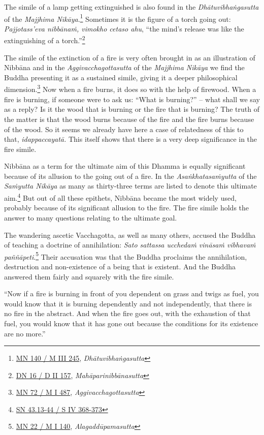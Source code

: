 The simile of a lamp getting extinguished is also found in the \emph{Dhātuvibhaṅgasutta} of the \emph{Majjhima Nikāya}.\footnote{\href{https://suttacentral.net/mn140/pli/ms}{MN 140 / M III 245}, \emph{Dhātuvibhaṅgasutta}} Sometimes it is the figure of a torch going out: \emph{Pajjotass'eva nibbānaṁ, vimokho cetaso ahu}, ``the mind's release was like the extinguishing of a torch.''\footnote{\href{https://suttacentral.net/dn16/pli/ms}{DN 16 / D II 157}, \emph{Mahāparinibbānasutta}}

The simile of the extinction of a fire is very often brought in as an illustration of Nibbāna and in the \emph{Aggivacchagottasutta} of the \emph{Majjhima Nikāya} we find the Buddha presenting it as a sustained simile, giving it a deeper philosophical dimension.\footnote{\href{https://suttacentral.net/mn72/pli/ms}{MN 72 / M I 487}, \emph{Aggivacchagottasutta}} Now when a fire burns, it does so with the help of firewood. When a fire is burning, if someone were to ask us: ``What is burning?'' -- what shall we say as a reply? Is it the wood that is burning or the fire that is burning? The truth of the matter is that the wood burns because of the fire and the fire burns because of the wood. So it seems we already have here a case of relatedness of this to that, \emph{idappaccayatā.} This itself shows that there is a very deep significance in the fire simile.

Nibbāna as a term for the ultimate aim of this Dhamma is equally significant because of its allusion to the going out of a fire. In the \emph{Asaṅkhatasaṁyutta} of the \emph{Saṁyutta Nikāya} as many as thirty-three terms are listed to denote this ultimate aim.\footnote{\href{https://suttacentral.net/sn43.13/pli/ms}{SN 43.13-44 / S IV 368-373}} But out of all these epithets, Nibbāna became the most widely used, probably because of its significant allusion to the fire. The fire simile holds the answer to many questions relating to the ultimate goal.

The wandering ascetic Vacchagotta, as well as many others, accused the Buddha of teaching a doctrine of annihilation: \emph{Sato sattassa ucchedaṁ vināsaṁ vibhavaṁ paññāpeti}.\footnote{\href{https://suttacentral.net/mn22/pli/ms}{MN 22 / M I 140}, \emph{Alagaddūpamasutta}} Their accusation was that the Buddha proclaims the annihilation, destruction and non-existence of a being that is existent. And the Buddha answered them fairly and squarely with the fire simile.

``Now if a fire is burning in front of you dependent on grass and twigs as fuel, you would know that it is burning dependently and not independently, that there is no fire in the abstract. And when the fire goes out, with the exhaustion of that fuel, you would know that it has gone out because the conditions for its existence are no more.''

